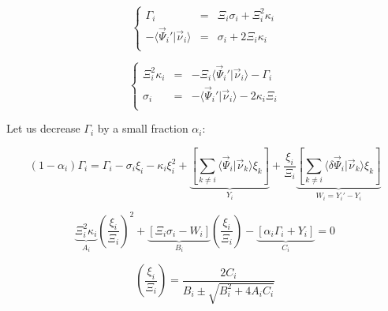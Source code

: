 \documentclass[aps,12pt]{revtex4}
\begin{document}
\begin{equation}
\left\lbrace
\begin{array}{rcl}
	\Gamma_i & = & \Xi_i \sigma_i + \Xi_i^2 \kappa_i\\
	-\langle \vec{\Psi}_i' \vert \vec{\nu}_i \rangle & = & \sigma_i + 2 \Xi_i \kappa_i\\
\end{array}
\right.
\end{equation}

\begin{equation}
\left\lbrace
\begin{array}{rcl}
	\Xi_i^2 \kappa_i & = & -\Xi_i \langle \vec{\Psi}_i' \vert \vec{\nu}_i \rangle - \Gamma_i\\
	\sigma_i         & = & -\langle \vec{\Psi}_i' \vert \vec{\nu}_i \rangle - 2\kappa_i \Xi_i\\
\end{array}
\right.
\end{equation}

Let us decrease $\Gamma_i$ by a small fraction $\alpha_i$:

\begin{equation}
	(1-\alpha_i) \Gamma_i = \Gamma_i - \sigma_i \xi_i - \kappa_i \xi_i^2 
	+ \underbrace{\left[ \sum_{k\not=i} \langle \vec{\Psi}_i \vert \vec{\nu}_k \rangle \xi_k \right]}_{Y_i}
	+ \dfrac{\xi_i}{\Xi_i} \underbrace{\left[ \sum_{k\not=i} \langle \delta\vec{\Psi}_i \vert \vec{\nu}_k \rangle \xi_k \right]}_{W_i=Y_i'-Y_i}
\end{equation}


\begin{equation}
	\underbrace{\Xi_i^2 \kappa_i}_{A_i} \left(\dfrac{\xi_i}{\Xi_i}\right)^2 + \underbrace{\left[ \Xi_i \sigma_i - W_i \right]}_{B_i} \left(\dfrac{\xi_i}{\Xi_i}\right)
	- \underbrace{\left[ \alpha_i \Gamma_i + Y_i \right]}_{C_i} = 0
\end{equation}

\begin{equation}
	\left(\dfrac{\xi_i}{\Xi_i}\right) = \dfrac{2C_i}{B_i \pm \sqrt{B_i^2+4A_iC_i}}
\end{equation}
\end{document}
